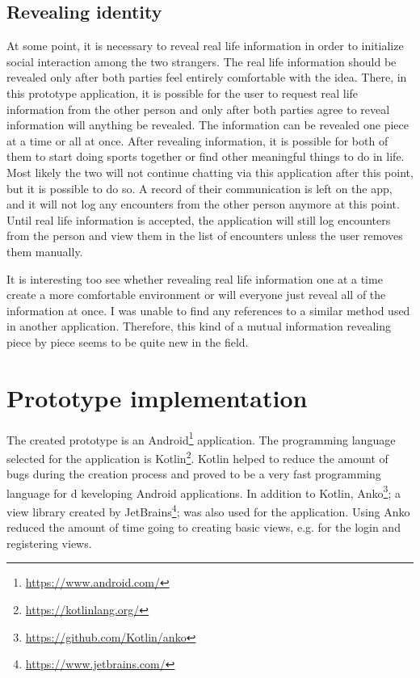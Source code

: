 \subsection{Revealing identity}

At some point, it is necessary to reveal real life information in order to initialize social interaction among the two strangers. The real life information should be revealed only after both parties feel entirely comfortable with the idea. There, in this prototype application, it is possible for the user to request real life information from the other person and only after both parties agree to reveal information will anything be revealed. The information can be revealed one piece at a time or all at once. After revealing information, it is possible for both of them to start doing sports together or find other meaningful things to do in life. Most likely the two will not continue chatting via this application after this point, but it is possible to do so. A record of their communication is left on the app, and it will not log any encounters from the other person anymore at this point. Until real life information is accepted, the application will still log encounters from the person and view them in the list of encounters unless the user removes them manually.

It is interesting too see whether revealing real life information one at a time create a more comfortable environment or will everyone just reveal all of the information at once. I was unable to find any references to a similar method used in another application. Therefore, this kind of a mutual information revealing piece by piece seems to be quite new in the field.

\section{Prototype implementation}

The created prototype is an Android\footnote{\url{https://www.android.com/}} application. The programming language selected for the application is Kotlin\footnote{\url{https://kotlinlang.org/}}. Kotlin helped to reduce the amount of bugs during the creation process and proved to be a very fast programming language for d	keveloping Android applications. In addition to Kotlin, Anko\footnote{\url{https://github.com/Kotlin/anko}}; a view library created by JetBrains\footnote{\url{https://www.jetbrains.com/}}; was also used for the application. Using Anko reduced the amount of time going to creating basic views, e.g. for the login and registering views.


